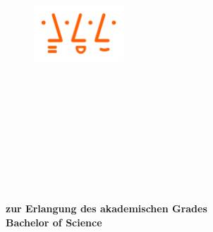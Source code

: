 \thispagestyle{empty}

\begin{figure}[t]
 \centering
 \includegraphics[width=0.3\textwidth]{abb/logoHSA}
\end{figure}


\begin{verbatim}


\end{verbatim}

\begin{center}
\Large{\institution}
\end{center}


\begin{center}
\Large{\insSection}
\end{center}
\begin{verbatim}




\end{verbatim}
\begin{center}
\doublespacing
\textbf{\LARGE{\titleDocument}}
\singlespacing
\begin{verbatim}

\end{verbatim}
\textbf{{~\subjectDocument~}}
\end{center}
\begin{verbatim}

\end{verbatim}
\begin{center}

\end{center}
\begin{verbatim}

\end{verbatim}
\begin{center}
\textbf{zur Erlangung des akademischen Grades \\ Bachelor of Science}
\end{center}
\begin{verbatim}






\end{verbatim}


